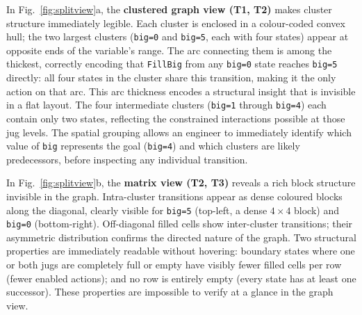 \documentclass[conference]{IEEEtran}
\begin{document}

In Fig.~\ref{fig:splitview}a, the \textbf{clustered graph view (T1, T2)} makes cluster structure immediately legible. Each cluster is enclosed in a colour-coded convex hull; the two largest clusters (\texttt{big=0} and \texttt{big=5}, each with four states) appear at opposite ends of the variable's range. The arc connecting them is among the thickest, correctly encoding that \texttt{FillBig} from any \texttt{big=0} state reaches \texttt{big=5} directly: all four states in the cluster share this transition, making it the only action on that arc. This arc thickness encodes a structural insight that is invisible in a flat layout. The four intermediate clusters (\texttt{big=1} through \texttt{big=4}) each contain only two states, reflecting the constrained interactions possible at those jug levels. The spatial grouping allows an engineer to immediately identify which value of \texttt{big} represents the goal (\texttt{big=4}) and which clusters are likely predecessors, before inspecting any individual transition.



In Fig.~\ref{fig:splitview}b, the \textbf{matrix view (T2, T3)} reveals a rich block structure invisible in the graph. Intra-cluster transitions appear as dense coloured blocks along the diagonal, clearly visible for \texttt{big=5} (top-left, a dense $4 \times 4$ block) and \texttt{big=0} (bottom-right). Off-diagonal filled cells show inter-cluster transitions; their asymmetric distribution confirms the directed nature of the graph. Two structural properties are immediately readable without hovering: boundary states where one or both jugs are completely full or empty have visibly fewer filled cells per row (fewer enabled actions); and no row is entirely empty (every state has at least one successor). These properties are impossible to verify at a glance in the graph view.
\end{document}
